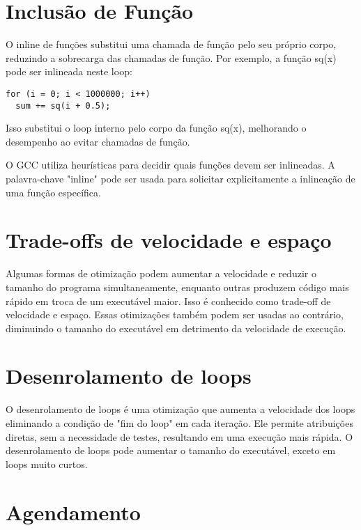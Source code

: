 \section{Inclusão de Função}

O inline de funções substitui uma chamada de função pelo seu próprio corpo, reduzindo a sobrecarga das chamadas de função. Por exemplo, a função sq(x) pode ser inlineada neste loop:

\begin{scriptsize}
\estiloC
\begin{lstlisting}[title=função sq(x)]
for (i = 0; i < 1000000; i++)
  sum += sq(i + 0.5);
\end{lstlisting}
\end{scriptsize}

Isso substitui o loop interno pelo corpo da função sq(x), melhorando o desempenho ao evitar chamadas de função.

O GCC utiliza heurísticas para decidir quais funções devem ser inlineadas. A palavra-chave "inline" pode ser usada para solicitar explicitamente a inlineação de uma função específica.

\section{Trade-offs de velocidade e espaço}

Algumas formas de otimização podem aumentar a velocidade e reduzir o tamanho do programa simultaneamente, enquanto outras produzem código mais rápido em troca de um executável maior. Isso é conhecido como trade-off de velocidade e espaço. Essas otimizações também podem ser usadas ao contrário, diminuindo o tamanho do executável em detrimento da velocidade de execução.

\section{Desenrolamento de loops}

O desenrolamento de loops é uma otimização que aumenta a velocidade dos loops eliminando a condição de "fim do loop" em cada iteração. Ele permite atribuições diretas, sem a necessidade de testes, resultando em uma execução mais rápida. O desenrolamento de loops pode aumentar o tamanho do executável, exceto em loops muito curtos.

\section{Agendamento}


